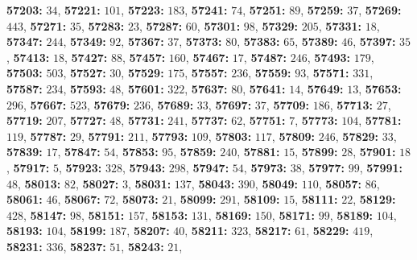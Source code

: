 \textsf{\bfseries 57203:} $34$, \textsf{\bfseries 57221:} $101$, \textsf{\bfseries 57223:} $183$, \textsf{\bfseries 57241:} $74$, \textsf{\bfseries 57251:} $89$, \textsf{\bfseries 57259:} $37$, \textsf{\bfseries 57269:} $443$, \textsf{\bfseries 57271:} $35$, \textsf{\bfseries 57283:} $23$, \textsf{\bfseries 57287:} $60$, \textsf{\bfseries 57301:} $98$, \textsf{\bfseries 57329:} $205$, \textsf{\bfseries 57331:} $18$, \textsf{\bfseries 57347:} $244$, \textsf{\bfseries 57349:} $92$, \textsf{\bfseries 57367:} $37$, \textsf{\bfseries 57373:} $80$, \textsf{\bfseries 57383:} $65$, \textsf{\bfseries 57389:} $46$, \textsf{\bfseries 57397:} $35$, \textsf{\bfseries 57413:} $18$, \textsf{\bfseries 57427:} $88$, \textsf{\bfseries 57457:} $160$, \textsf{\bfseries 57467:} $17$, \textsf{\bfseries 57487:} $246$, \textsf{\bfseries 57493:} $179$, \textsf{\bfseries 57503:} $503$, \textsf{\bfseries 57527:} $30$, \textsf{\bfseries 57529:} $175$, \textsf{\bfseries 57557:} $236$, \textsf{\bfseries 57559:} $93$, \textsf{\bfseries 57571:} $331$, \textsf{\bfseries 57587:} $234$, \textsf{\bfseries 57593:} $48$, \textsf{\bfseries 57601:} $322$, \textsf{\bfseries 57637:} $80$, \textsf{\bfseries 57641:} $14$, \textsf{\bfseries 57649:} $13$, \textsf{\bfseries 57653:} $296$, \textsf{\bfseries 57667:} $523$, \textsf{\bfseries 57679:} $236$, \textsf{\bfseries 57689:} $33$, \textsf{\bfseries 57697:} $37$, \textsf{\bfseries 57709:} $186$, \textsf{\bfseries 57713:} $27$, \textsf{\bfseries 57719:} $207$, \textsf{\bfseries 57727:} $48$, \textsf{\bfseries 57731:} $241$, \textsf{\bfseries 57737:} $62$, \textsf{\bfseries 57751:} $7$, \textsf{\bfseries 57773:} $104$, \textsf{\bfseries 57781:} $119$, \textsf{\bfseries 57787:} $29$, \textsf{\bfseries 57791:} $211$, \textsf{\bfseries 57793:} $109$, \textsf{\bfseries 57803:} $117$, \textsf{\bfseries 57809:} $246$, \textsf{\bfseries 57829:} $33$, \textsf{\bfseries 57839:} $17$, \textsf{\bfseries 57847:} $54$, \textsf{\bfseries 57853:} $95$, \textsf{\bfseries 57859:} $240$, \textsf{\bfseries 57881:} $15$, \textsf{\bfseries 57899:} $28$, \textsf{\bfseries 57901:} $18$, \textsf{\bfseries 57917:} $5$, \textsf{\bfseries 57923:} $328$, \textsf{\bfseries 57943:} $298$, \textsf{\bfseries 57947:} $54$, \textsf{\bfseries 57973:} $38$, \textsf{\bfseries 57977:} $99$, \textsf{\bfseries 57991:} $48$, \textsf{\bfseries 58013:} $82$, \textsf{\bfseries 58027:} $3$, \textsf{\bfseries 58031:} $137$, \textsf{\bfseries 58043:} $390$, \textsf{\bfseries 58049:} $110$, \textsf{\bfseries 58057:} $86$, \textsf{\bfseries 58061:} $46$, \textsf{\bfseries 58067:} $72$, \textsf{\bfseries 58073:} $21$, \textsf{\bfseries 58099:} $291$, \textsf{\bfseries 58109:} $15$, \textsf{\bfseries 58111:} $22$, \textsf{\bfseries 58129:} $428$, \textsf{\bfseries 58147:} $98$, \textsf{\bfseries 58151:} $157$, \textsf{\bfseries 58153:} $131$, \textsf{\bfseries 58169:} $150$, \textsf{\bfseries 58171:} $99$, \textsf{\bfseries 58189:} $104$, \textsf{\bfseries 58193:} $104$, \textsf{\bfseries 58199:} $187$, \textsf{\bfseries 58207:} $40$, \textsf{\bfseries 58211:} $323$, \textsf{\bfseries 58217:} $61$, \textsf{\bfseries 58229:} $419$, \textsf{\bfseries 58231:} $336$, \textsf{\bfseries 58237:} $51$, \textsf{\bfseries 58243:} $21$, 

